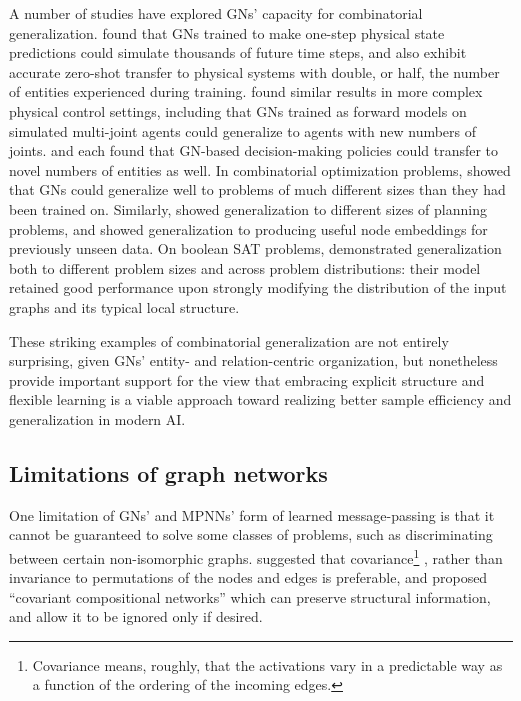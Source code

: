 A number of studies have explored GNs' capacity for combinatorial generalization. \cite{battaglia2016interaction} found that GNs trained to make one-step physical state predictions could simulate thousands of future time steps, and also exhibit accurate zero-shot transfer to physical systems with double, or half, the number of entities experienced during training. \cite{sanchez2018graph} found similar results in more complex physical control settings, including that GNs trained as forward models on simulated multi-joint agents could generalize to agents with new numbers of joints.
\cite{hamrick2018relational} and \cite{wang2018nervenet} each found that GN-based decision-making policies could transfer to novel numbers of entities as well.
%
In combinatorial optimization problems, \cite{bello2016neural,nowak2017note,dai2017learning,kool2018attentionTSP} showed that GNs could generalize well to problems of much different sizes than they had been trained on.
Similarly, \cite{toyer2017action} showed generalization to different sizes of planning problems, and \cite{hamilton2017inductive} showed generalization to producing useful node embeddings for previously unseen data. 
On boolean SAT problems, \cite{selsam2018learning} demonstrated generalization both to different problem sizes and across problem distributions: their model retained good performance upon strongly modifying the distribution of the input graphs and its typical local structure.

These striking examples of combinatorial generalization are not entirely surprising, given GNs' entity- and relation-centric organization, but nonetheless provide important support for the view that embracing explicit structure and flexible learning is a viable approach toward realizing better sample efficiency and generalization in modern AI.

\subsection{Limitations of graph networks}

One limitation of GNs' and MPNNs' form of learned message-passing \citep{shervashidze2011weisfeiler} is that it cannot be guaranteed to solve some classes of problems, such as discriminating between certain non-isomorphic graphs.  \cite{kondor2018covariant} suggested that covariance\footnote{Covariance means, roughly, that the activations vary in a predictable way as a function of the ordering of the incoming edges.} \citep{cohen2016group,kondor2018generalization}, rather than invariance to permutations of the nodes and edges is preferable, and proposed ``covariant compositional networks'' which can preserve structural information, and allow it to be ignored only if desired.

